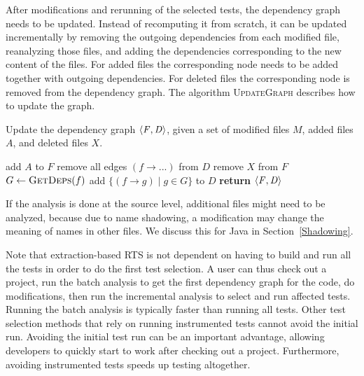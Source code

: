 {After modifications and rerunning of the selected tests, the dependency graph needs to be updated.
Instead of recomputing it from scratch, it can be updated incrementally by removing the outgoing dependencies from each modified file, reanalyzing those files, and adding the dependencies corresponding to the new content of the files.
For added files the corresponding node needs to be added together with outgoing dependencies.
For deleted files the corresponding node is removed from the dependency graph. The algorithm \textsc{UpdateGraph} describes how to update the graph.

\begin{algorithm}
\caption{Update the dependency graph $\left \langle \mathit{ F,D }\right \rangle $, given a set of modified files $M$, added files $A$, and deleted files $X$.}
\begin{algorithmic}
   \State add $A$ to $F$
    
      \State remove all edges $(f \rightarrow ...)$ from $D$ 
   \EndFor
   \State remove $X$ from $F$
    
      \State $G \gets \Call{GetDeps}{f}$
      \State add $\{(f \rightarrow g) \mid g \in G\}$ to $D$
   \EndFor
   \State \textbf{return} $\left \langle \mathit{ F,D }\right \rangle $
\EndProcedure
\end{algorithmic}
\end{algorithm}


If the analysis is done at the source level, additional files might need to be analyzed, because due to name shadowing, a modification may change the meaning of names in other files. We discuss this for Java in Section~\ref{Shadowing}.

Note that extraction-based RTS is not dependent on having to build and run all the tests in order to
do the first test selection. A user can thus check out a project, run the batch analysis to get the
first dependency graph for the code, do modifications, then run the incremental analysis to select
and run affected tests. Running the batch analysis is typically faster than running all tests. Other test selection methods that rely on running instrumented tests cannot avoid the initial run. Avoiding the initial test run can be an important advantage, allowing developers to quickly start to work after checking out a project. Furthermore, avoiding instrumented tests speeds up testing altogether.


}
